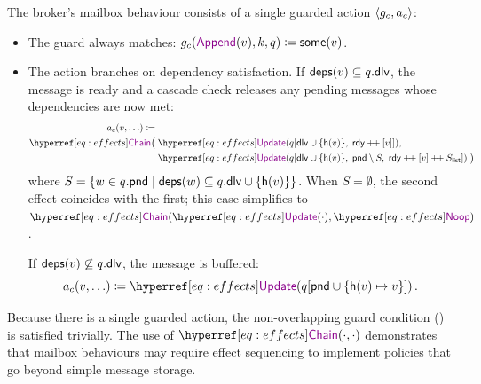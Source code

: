 \begin{example}
  The broker's mailbox behaviour consists of a single guarded action
  $ \langle g_{c} , a_{c} \rangle $:
  \begin{itemize}
  \item The guard always matches:
    $\guard{c}(\append(v), k, q) \coloneqq \some{v}$.
  \item The action branches on dependency satisfaction.
    If $\mathsf{deps}(v) \subseteq q.\mathsf{dlv}$, the message is ready
    and a cascade check releases any pending messages whose dependencies are
    now met:
    \begin{align*}
      \action{c}(v, \ldots) \coloneqq {}&\\
        \refeffect{Chain}\bigl(\;
          &\update{q[\fdlv \cup \{\mhash{v}\},\;
                    \frdy \pp [v]]},\\
          &\update{q[\fdlv \cup \{\mhash{v}\},\;
                    \fpnd \setminus S,\;
                    \frdy \pp [v] \pp S_{\mathsf{list}}]}\;\bigr)
    \end{align*}
    where $S = \{ w \in q.\mathsf{pnd} \mid \mathsf{deps}(w)
    \subseteq q.\mathsf{dlv} \cup \{\mathsf{h}(v)\}\}$.
    When $S = \emptyset$, the second effect coincides with the first;
    this case simplifies to $\chain{\update{\cdot}}{\noop}$.

    If $\mathsf{deps}(v) \not\subseteq q.\mathsf{dlv}$, the message is
    buffered:
    \[
      \action{c}(v, \ldots) \coloneqq
        \update{q[\fpnd \cup \{\mhash{v} \mapsto v\}]}\,.
    \]
  \end{itemize}
  Because there is a single guarded action, the non-overlapping guard
  condition () is satisfied trivially. The
  use of $\chain{\cdot}{\cdot}$ demonstrates that mailbox behaviours may
  require effect sequencing to implement policies that go beyond simple
  message storage.
\end{example}
